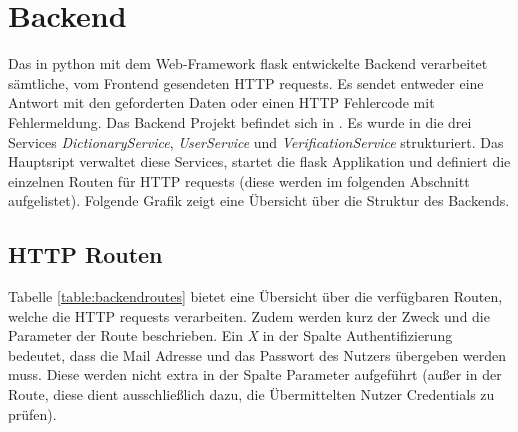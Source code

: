 \section{Backend}

Das in python mit dem Web-Framework flask entwickelte Backend verarbeitet sämtliche, vom Frontend gesendeten HTTP requests. Es sendet entweder eine Antwort mit den geforderten Daten oder einen HTTP Fehlercode mit Fehlermeldung. Das Backend Projekt befindet sich in . Es wurde in die drei Services \textit{DictionaryService}, \textit{UserService} und \textit{VerificationService} strukturiert. Das Hauptsript   verwaltet diese Services, startet die flask Applikation und definiert die einzelnen Routen für HTTP requests (diese werden im folgenden Abschnitt aufgelistet). Folgende Grafik zeigt eine Übersicht über die Struktur des Backends.


\subsection{HTTP Routen}
Tabelle \ref{table:backendroutes} bietet eine Übersicht über die verfügbaren Routen, welche die HTTP requests verarbeiten. Zudem werden kurz der Zweck und die Parameter der Route beschrieben. Ein \textit{X} in der Spalte Authentifizierung bedeutet, dass die Mail Adresse und das Passwort des Nutzers übergeben werden muss. Diese werden nicht extra in der Spalte Parameter aufgeführt (außer in der  Route, diese dient ausschließlich dazu, die Übermittelten Nutzer Credentials zu prüfen).

